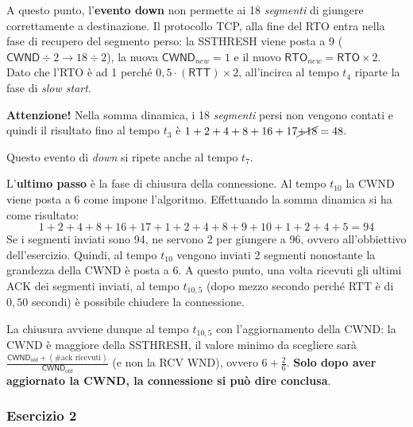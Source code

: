 \documentclass[a4paper]{article}
\begin{document}
	\noindent
	A questo punto, l’\textbf{evento down} non permette ai 18 \emph{segmenti} di giungere correttamente a destinazione. Il protocollo TCP, alla fine del RTO entra nella fase di recupero del segmento perso: la \textsf{SSTHRESH} viene posta a 9 ($\textsf{CWND} \div 2 \rightarrow 18 \div 2$), la nuova $\textsf{CWND}_{new} = 1$ e il nuovo $\textsf{RTO}_{new} = \textsf{RTO} \times 2$. Dato che l’\textsf{RTO} è ad 1 perché $0,5 \cdot \left(\textsf{RTT}\right) \times 2$, all’incirca al tempo $t_{4}$ riparte la fase di \emph{slow start}.\newline
	
	\noindent
	\textbf{Attenzione!} Nella somma dinamica, i 18 \emph{segmenti} persi non vengono contati e quindi il risultato fino al tempo $t_{3}$ è $1+2+4+8+16+17\cancel{+18}=48$.\newline
	
	\noindent
	Questo evento di \emph{down} si ripete anche al tempo $t_{7}$.\newline
	
	\noindent
	L'\textbf{ultimo passo} è la fase di chiusura della connessione. Al tempo $t_{10}$ la \textsf{CWND} viene posta a 6 come impone l'algoritmo. Effettuando la somma dinamica si ha come risultato:
	\begin{equation*}
		1+2+4+8+16+17+1+2+4+8+9+10+1+2+4+5=94
	\end{equation*}
	Se i segmenti inviati sono 94, ne servono 2 per giungere a 96, ovvero all’obbiettivo dell’esercizio. Quindi, al tempo $t_{10}$ vengono inviati 2 segmenti nonostante la grandezza della \textsf{CWND} è posta a 6. A questo punto, una volta ricevuti gli ultimi \textsf{ACK} dei segmenti inviati, al tempo $t_{10,5}$ (dopo mezzo secondo perché \textsf{RTT} è di $0,50$ secondi) è possibile chiudere la connessione.\newline
	
	\noindent
	La chiusura avviene dunque al tempo $t_{10,5}$ con l’aggiornamento della \textsf{CWND}: la \textsf{CWND} è maggiore della \textsf{SSTHRESH}, il valore minimo da scegliere sarà $\frac{\textsf{CWND}_{old} + \left(\text{\#ack ricevuti}\right)}{\textsf{CWND}_{old}}$  (e non la \textsf{RCV WND}), ovvero $6+\frac{2}{6}$. \textbf{Solo dopo aver aggiornato la \textsf{CWND}, la connessione si può dire conclusa}.\newpage
	
	\subsubsection{\textcolor{Red3}{Esercizio 2}}
	
\end{document}
